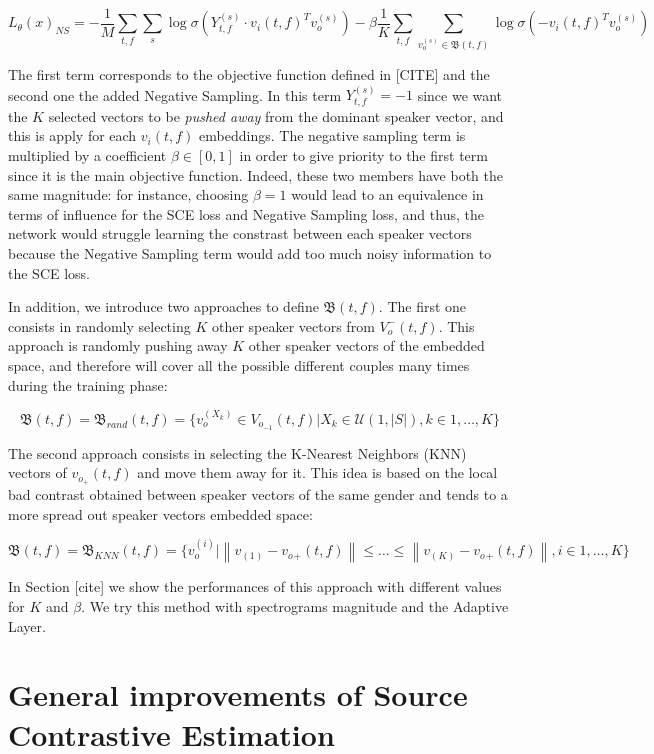 \documentclass[master,final,11pt]{iscs-thesis}
\newcommand{\norm}[1]{\left\lVert#1\right\rVert}
\begin{document}
\begin{center}
\[L_\theta(x)_{NS} = - \frac{1}{M} \sum_{t,f} \sum_{s} \log \sigma(Y_{t,f}^{(s)} \cdot v_i(t,f)^{T} v_o^{(s)}) - \beta \frac{1}{K} \sum_{t,f} \sum_{v_o^{(s)} \in \mathfrak{B}(t,f)} \log \sigma(- v_i(t,f)^{T} v_o^{(s)}) \]
\end{center}

The first term corresponds to the objective function defined in [CITE] and the second one the added Negative Sampling. In this term $Y_{t,f}^{(s)} = -1$ since we want the $K$ selected vectors to be \textit{pushed away} from the dominant speaker vector, and this is apply for each $v_i(t,f)$ embeddings. The negative sampling term is multiplied by a coefficient $\beta \in[0,1]$ in order to give priority to the first term since it is the main objective function. Indeed, these two members have both the same magnitude: for instance, choosing $\beta = 1$ would lead to an equivalence in terms of influence for the SCE loss and Negative Sampling loss, and thus, the network would struggle learning the constrast between each speaker vectors because the Negative Sampling term would add too much noisy information to the SCE loss. 

In addition, we introduce two approaches to define $\mathfrak{B}(t,f)$. The first one consists in randomly selecting $K$ other speaker vectors from $V_o^-(t,f)$. This approach is randomly pushing away $K$ other speaker vectors of the embedded space, and therefore will cover all the possible different couples many times during the training phase:

\[\mathfrak{B}(t,f) = \mathfrak{B}_{rand}(t,f) = \{v_o^{(X_k)} \in V_{o_{-1}}(t,f) | X_k \in \mathcal{U}(1,|S|), k \in 1, \dotsc,K\} \]

The second approach consists in selecting the K-Nearest Neighbors (KNN) vectors of $v_{o_{+}}(t,f)$ and move them away for it. This idea is based on the local bad contrast obtained between speaker vectors of the same gender and tends to a more spread out speaker vectors embedded space:


\[\mathfrak{B}(t,f) = \mathfrak{B}_{KNN}(t,f) = \{v_o^{(i)} | \norm{v_{{(1)}}-v_o{_{+}}(t,f)} \leq \dots \leq \norm{v_{{(K)}}-v_o{_{+}}(t,f)}, i \in 1, \dotsc,K\}\]

In Section [cite] we show the performances of this approach with different values for $K$ and $\beta$. We try this method with spectrograms magnitude and the Adaptive Layer.


\section{General improvements of Source Contrastive Estimation}
\end{document}
